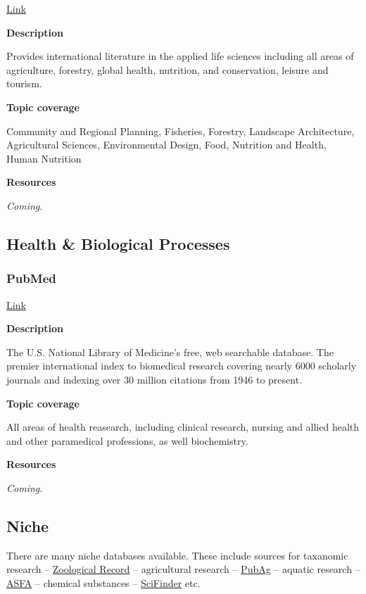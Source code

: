\documentclass[
]{book}
\begin{document}
\href{https://resources.library.ubc.ca/page.php?details=cab-direct&id=107}{Link}

\textbf{Description}

Provides international literature in the applied life sciences including all areas of agriculture, forestry, global health, nutrition, and conservation, leisure and tourism.

\textbf{Topic coverage}

Community and Regional Planning, Fisheries, Forestry, Landscape Architecture, Agricultural Sciences, Environmental Design, Food, Nutrition and Health, Human Nutrition

\textbf{Resources}

\emph{Coming}.

\subsection{Health \& Biological Processes}\label{health-biological-processes}

\subsubsection{PubMed}\label{pubmed}

\href{https://resources.library.ubc.ca/page.php?details=pubmed&id=166}{Link}

\textbf{Description}

The U.S. National Library of Medicine's free, web searchable database. The premier international index to biomedical research covering nearly 6000 scholarly journals and indexing over 30 million citations from 1946 to present.

\textbf{Topic coverage}

All areas of health reasearch, including clinical research, nursing and allied health and other paramedical professions, as well biochemistry.

\textbf{Resources}

\emph{Coming}.

\subsection{Niche}\label{niche}

There are many niche databases available. These include sources for taxanomic research -- \href{https://resources.library.ubc.ca/page.php?details=zoological-record&id=1121}{Zoological Record} -- agricultural research -- \href{https://resources.library.ubc.ca/page.php?details=pubag&id=2250}{PubAg} -- aquatic research -- \href{https://resources.library.ubc.ca/page.php?id=108}{ASFA} -- chemical substances -- \href{https://resources.library.ubc.ca/page.php?id=293}{SciFinder} etc.
\end{document}
